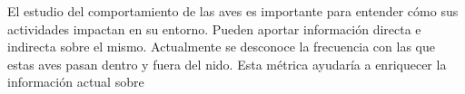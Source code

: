 %

%


El estudio del comportamiento de las aves es importante para entender cómo sus actividades impactan en su entorno. Pueden aportar información directa e indirecta sobre el mismo. Actualmente se desconoce la frecuencia con las que estas aves pasan dentro y fuera del nido. Esta métrica ayudaría a enriquecer la información actual sobre 



%